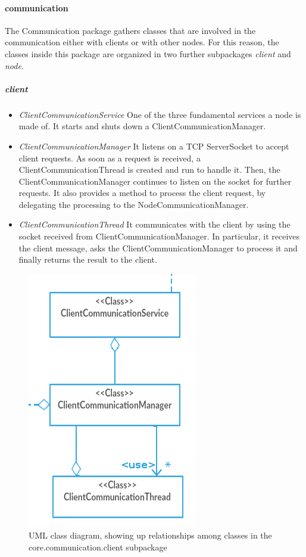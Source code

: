 \documentclass{article}
\begin{document}
\paragraph{communication} The Communication package gathers classes that are involved in the communication either with clients or with other nodes. For this reason, the classes inside this package are organized in two further subpackages \textit{client} and \textit{node}. 
\subparagraph{client} 
\begin{itemize}
\item \textit{ClientCommunicationService} One of the three fundamental services a node is made of. It starts and shuts down a ClientCommunicationManager.
\item \textit{ClientCommunicationManager} It listens on a TCP ServerSocket to accept client requests. As soon as a request is received, a ClientCommunicationThread is created and run to handle it. Then, the ClientCommunicationManager continues to listen on the socket for further requests. It also provides a method to process the client request, by delegating the processing to the NodeCommunicationManager.
\item \textit{ClientCommunicationThread} It communicates with the client by using the socket received from ClientCommunicationManager. In particular, it receives the client message, asks the ClientCommunicationManager to process it and finally returns the result to the client.
\end{itemize}
\begin{figure}[h]
\centering
\includegraphics[scale=0.40]{classes_client_subpackage}
\caption{UML class diagram, showing up relationships among classes in the core.communication.client subpackage}
\label{fig:class_diag_core.communication.client	}
\end{figure}
\end{document}
